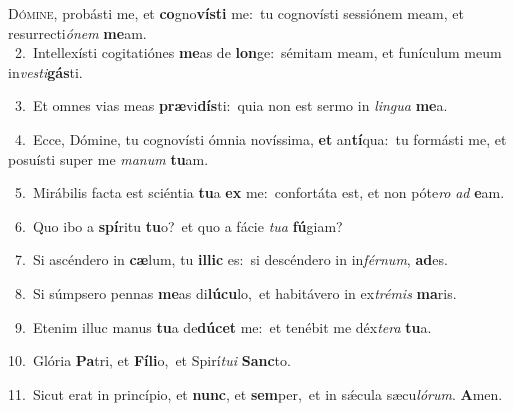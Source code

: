 \lettrine{\initial\textcolor{\initialcolor}{D}}{ómine,} probásti me, et \textbf{co}\-gno\-\textbf{vís}\-\textbf{ti} me:~\star tu cognovísti sessiónem meam, et resurrecti\-\textit{ó}\-\textit{nem} \textbf{me}\-am.\\
{\numbfont\textcolor{\numbcolor}{~2.}}~Intellexísti cogitatiónes \textbf{me}\-as de \textbf{lon}\-ge:~\star sémitam meam, et funículum meum in\-\textit{ves}\-\textit{ti}\textbf{gás}ti.\par
{\numbfont\textcolor{\numbcolor}{~3.}}~Et omnes vias meas \textbf{præ}\-vi\-\textbf{dís}\-ti:~\star quia non est sermo in \textit{lin}\-\textit{gua} \textbf{me}\-a.\par
{\numbfont\textcolor{\numbcolor}{~4.}}~Ecce, Dómine, tu cognovísti ómnia novíssima, \textbf{et} an\-\textbf{tí}\-qua:~\star tu formásti me, et posuísti super me \textit{ma}\-\textit{num} \textbf{tu}\-am.\par
{\numbfont\textcolor{\numbcolor}{~5.}}~Mirábilis facta est sciéntia \textbf{tu}\-a \textbf{ex} me:~\star confortáta est, et non póte\textit{ro} \textit{ad} \textbf{e}\-am.\par
{\numbfont\textcolor{\numbcolor}{~6.}}~Quo ibo a \textbf{spí}\-ritu \textbf{tu}\-o?~\star et quo a fácie \textit{tu}\-\textit{a} \textbf{fú}\-giam?\par
{\numbfont\textcolor{\numbcolor}{~7.}}~Si ascéndero in \textbf{cæ}\-lum, tu \textbf{il}\-\textbf{lic} es:~\star si descéndero in in\-\textit{fér}\-\textit{num}, \textbf{ad}\-es.\par
{\numbfont\textcolor{\numbcolor}{~8.}}~Si súmpsero pennas \textbf{me}\-as di\-\textbf{lú}\-\textbf{cu}lo,~\star et habitávero in ex\-\textit{tré}\-\textit{mis} \textbf{ma}\-ris.\par
{\numbfont\textcolor{\numbcolor}{~9.}}~Etenim illuc manus \textbf{tu}\-a de\-\textbf{dú}\-\textbf{cet} me:~\star et tenébit me déx\-\textit{te}\-\textit{ra} \textbf{tu}\-a.\par
{\numbfont\textcolor{\numbcolor}{10.}}~Glória \textbf{Pa}\-tri, et \textbf{Fí}\-\textbf{li}o,~\star et Spirí\-\textit{tu}\-\textit{i} \textbf{Sanc}\-to.\par
{\numbfont\textcolor{\numbcolor}{11.}}~Sicut erat in princípio, et \textbf{nunc}\-, et \textbf{sem}\-per,~\star et in sǽcula sæcu\-\textit{ló}\-\textit{rum}. \textbf{A}\-men.\par
